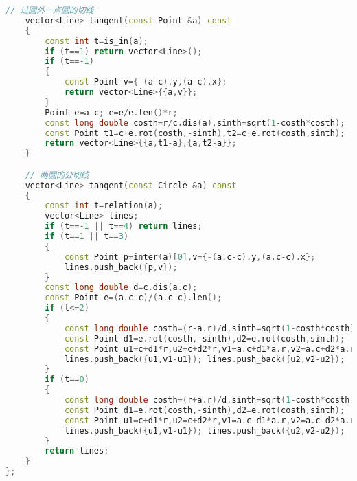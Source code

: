 \documentclass[a4paper]{book}
\begin{document}
\begin{lstlisting}[language=c++]
    // 过圆外一点圆的切线
    vector<Line> tangent(const Point &a) const
    {
        const int t=is_in(a);
        if (t==1) return vector<Line>();
        if (t==-1)
        {
            const Point v={-(a-c).y,(a-c).x};
            return vector<Line>{{a,v}};
        }
        Point e=a-c; e=e/e.len()*r;
        const long double costh=r/c.dis(a),sinth=sqrt(1-costh*costh);
        const Point t1=c+e.rot(costh,-sinth),t2=c+e.rot(costh,sinth);
        return vector<Line>{{a,t1-a},{a,t2-a}};
    }

    // 两圆的公切线
    vector<Line> tangent(const Circle &a) const
    {
        const int t=relation(a);
        vector<Line> lines;
        if (t==-1 || t==4) return lines;
        if (t==1 || t==3)
        {
            const Point p=inter(a)[0],v={-(a.c-c).y,(a.c-c).x};
            lines.push_back({p,v});
        }
        const long double d=c.dis(a.c);
        const Point e=(a.c-c)/(a.c-c).len();
        if (t<=2)
        {
            const long double costh=(r-a.r)/d,sinth=sqrt(1-costh*costh);
            const Point d1=e.rot(costh,-sinth),d2=e.rot(costh,sinth);
            const Point u1=c+d1*r,u2=c+d2*r,v1=a.c+d1*a.r,v2=a.c+d2*a.r;
            lines.push_back({u1,v1-u1}); lines.push_back({u2,v2-u2});
        }
        if (t==0)
        {
            const long double costh=(r+a.r)/d,sinth=sqrt(1-costh*costh);
            const Point d1=e.rot(costh,-sinth),d2=e.rot(costh,sinth);
            const Point u1=c+d1*r,u2=c+d2*r,v1=a.c-d1*a.r,v2=a.c-d2*a.r;
            lines.push_back({u1,v1-u1}); lines.push_back({u2,v2-u2});
        }
        return lines;
    }
};


\end{lstlisting}
\end{document}

